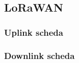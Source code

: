 \subsection{LoRaWAN}\label{ssec:lorawan}

  \subsubsection{Uplink scheda}\label{sssec:uplink_scheda}


  \subsubsection{Downlink scheda}




